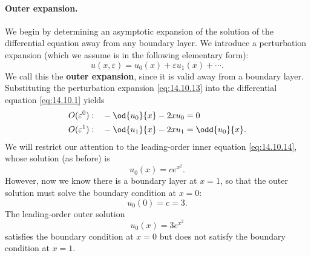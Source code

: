 \paragraph{Outer expansion.}
We begin by determining an asymptotic expansion of the solution of the differential equation away from any boundary layer. We introduce a perturbation expansion (which we assume is in the following elementary form):
\begin{equation}
u(x, \varepsilon) = u_0(x) + \varepsilon u_1(x) + \cdots.
\label{eq:14.10.13}
\end{equation}
We call this the \textbf{outer expansion}, since it is valid away from a boundary layer.
Substituting the perturbation expansion \eqref{eq:14.10.13} into the differential equation \eqref{eq:14.10.1} yields
\begin{align}
O(\varepsilon^0): \quad &-\od{u_0}{x} - 2xu_0 = 0 \label{eq:14.10.14} \\
O(\varepsilon^1): \quad &-\od{u_1}{x} - 2xu_1 = \odd{u_0}{x}. \label{eq:14.10.15}
\end{align}
We will restrict our attention to the leading-order inner equation \eqref{eq:14.10.14}, whose solution (as before) is
\begin{equation}
u_0(x) = ce^{x^2}.
\label{eq:14.10.16}
\end{equation}
However, now we know there is a boundary layer at $x = 1$, so that the outer solution must solve the boundary condition at $x = 0$:
\begin{equation}
u_0(0) = c = 3.
\label{eq:14.10.17}
\end{equation}
The leading-order outer solution
\begin{equation}
u_0(x) = 3e^{x^2}
\label{eq:14.10.18}
\end{equation}
satisfies the boundary condition at $x = 0$ but does not satisfy the boundary condition at $x = 1$.

